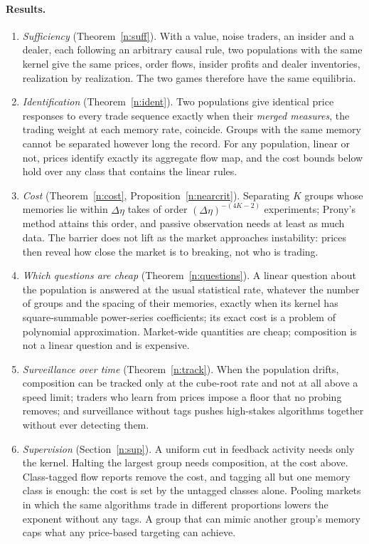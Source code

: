 \documentclass[12pt]{article}
\theoremstyle{definition}
\theoremstyle{remark}
\begin{document}
\paragraph{Results.}
\begin{enumerate}[label=(\arabic*),leftmargin=*,itemsep=2pt]
\item \emph{Sufficiency} (Theorem~\ref{n:suff}). With a value, noise traders, an insider and a dealer, each following an arbitrary causal rule, two populations with the same kernel give the same prices, order flows, insider profits and dealer inventories, realization by realization. The two games therefore have the same equilibria.
\item \emph{Identification} (Theorem~\ref{n:ident}). Two populations give identical price responses to every trade sequence exactly when their \emph{merged measures}, the trading weight at each memory rate, coincide. Groups with the same memory cannot be separated however long the record. For any population, linear or not, prices identify exactly its aggregate flow map, and the cost bounds below hold over any class that contains the linear rules.
\item \emph{Cost} (Theorem~\ref{n:cost}, Proposition~\ref{n:nearcrit}). Separating $K$ groups whose memories lie within $\Delta\eta$ takes of order $(\Delta\eta)^{-(4K-2)}$ experiments; Prony's method attains this order, and passive observation needs at least as much data. The barrier does not lift as the market approaches instability: prices then reveal how close the market is to breaking, not who is trading.
\item \emph{Which questions are cheap} (Theorem~\ref{n:questions}). A linear question about the population is answered at the usual statistical rate, whatever the number of groups and the spacing of their memories, exactly when its kernel has square-summable power-series coefficients; its exact cost is a problem of polynomial approximation. Market-wide quantities are cheap; composition is not a linear question and is expensive.
\item \emph{Surveillance over time} (Theorem~\ref{n:track}). When the population drifts, composition can be tracked only at the cube-root rate and not at all above a speed limit; traders who learn from prices impose a floor that no probing removes; and surveillance without tags pushes high-stakes algorithms together without ever detecting them.
\item \emph{Supervision} (Section~\ref{n:sup}). A uniform cut in feedback activity needs only the kernel. Halting the largest group needs composition, at the cost above. Class-tagged flow reports remove the cost, and tagging all but one memory class is enough: the cost is set by the untagged classes alone. Pooling markets in which the same algorithms trade in different proportions lowers the exponent without any tags. A group that can mimic another group's memory caps what any price-based targeting can achieve.

\end{enumerate}
\end{document}
